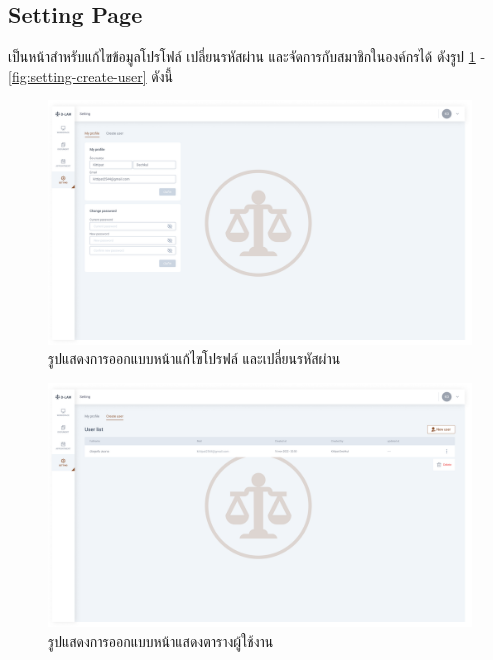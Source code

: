 \documentclass[12pt,oneside,openright,a4paper]{cpe-thai-project}
\begin{document}
\clearpage

\newpage
\subsection{Setting Page}
\hspace*{1cm} เป็นหน้าสำหรับแก้ไขข้อมูลโปรโฟล์ เปลี่ยนรหัสผ่าน และจัดการกับสมาชิกในองค์กรได้ ดังรูป \ref{fig:setting-myprofile} - \ref{fig:setting-create-user} ดังนี้

\begin{figure}[!h]\centering
  \includegraphics[width=16cm]{./assets/userinterface/setting-myprofile.png}
  \caption{รูปแสดงการออกแบบหน้าแก้ไขโปรฟล์ และเปลี่ยนรหัสผ่าน }\label{fig:setting-myprofile}
\end{figure}

\begin{figure}[!h]\centering
  \includegraphics[width=16cm]{./assets/userinterface/setting-manage-user.png}
  \caption{รูปแสดงการออกแบบหน้าแสดงตารางผู้ใช้งาน}\label{fig:setting-manage-user}
\end{figure}
\end{document}
